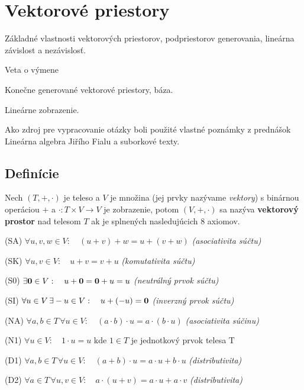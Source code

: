 \section{Vektorové priestory}

\begin{poziadavky}
\begin{pitemize}
\item Základné vlastnosti vektorových priestorov, podpriestorov generovania, lineárna závislost a nezávislosť.
\item Veta o výmene
\item Konečne generované vektorové priestory, báza.
\item Lineárne zobrazenie.
\end{pitemize}
\end{poziadavky}

\noindent Ako zdroj pre vypracovanie otázky boli použité vlastné poznámky z prednášok Lineárna algebra Jiřího Fialu a suborkové texty.

\subsection{Definície}
\begin{definicia}
Nech $(T,+,\cdot)$ je teleso a $V$ je množina (jej prvky nazývame \emph{vektory}) s binárnou operáciou $+$ a $\cdot :T \times V\to V$ je zobrazenie, potom $(V,+,\cdot)$ sa nazýva \textbf{vektorový prostor} nad telesom $T$ ak je splnených nasledujúcich 8 axiomov.
\begin{penumerate}
\item[(SA)] $\forall u,v,w \in V: \quad (u+v)+w = u+(v+w)$ \hfill\textit{(asociativita súčtu)}
\item[(SK)] $\forall u,v \in V: \quad u+v = v+u$ \hfill\textit{(komutativita súčtu)}
\item[(S0)] $\exists {\bf 0}\in V: \quad u + {\bf 0} = {\bf 0} + u = u$ \hfill\textit{(neutrálný prvok súčtu)}
\item[(SI)] $\forall u \in V \, \exists -u \in V: \quad u + (-u) = {\bf 0}$ \hfill\textit{(inverzný prvok súčtu)}
\item[(NA)] $\forall a,b \in T \, \forall u \in V: \quad (a\cdot b) \cdot u = a \cdot (b \cdot u)$ \hfill\textit{(asociativita súčinu)}
\item[(N1)] $\forall u \in V: \quad 1 \cdot u = u$ \hspace{0.5cm} kde $1 \in T$ je jednotkový prvok telesa T
\item[(D1)] $\forall a,b \in T \, \forall u \in V: \quad (a+b) \cdot u = a \cdot u + b \cdot u$ \hfill\textit{(distributivita)}
\item[(D2)] $\forall a \in T \, \forall u,v \in V: \quad a \cdot (u+v) = a \cdot u + a \cdot v$ \hfill\textit{(distributivita)}
\end{penumerate}
\end{definicia}

